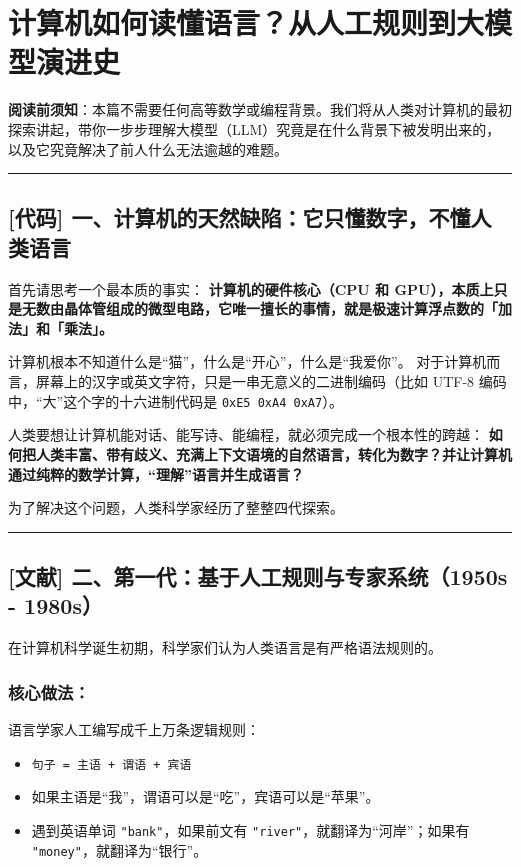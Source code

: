 \chapter{计算机如何读懂语言？从人工规则到大模型演进史}

\begin{noteBox}[核心导读与背景]
\textbf{阅读前须知}：本篇不需要任何高等数学或编程背景。我们将从人类对计算机的最初探索讲起，带你一步步理解大模型（LLM）究竟是在什么背景下被发明出来的，以及它究竟解决了前人什么无法逾越的难题。
\end{noteBox}

\vspace{0.8em}\hrule\vspace{0.8em}

\section{[代码] 一、计算机的天然缺陷：它只懂数字，不懂人类语言}

首先请思考一个最本质的事实：
\textbf{计算机的硬件核心（CPU 和 GPU），本质上只是无数由晶体管组成的微型电路，它唯一擅长的事情，就是极速计算浮点数的「加法」和「乘法」。}

计算机根本不知道什么是“猫”，什么是“开心”，什么是“我爱你”。
对于计算机而言，屏幕上的汉字或英文字符，只是一串无意义的二进制编码（比如 UTF-8 编码中，“大”这个字的十六进制代码是 \texttt{0xE5 0xA4 0xA7}）。

人类要想让计算机能对话、能写诗、能编程，就必须完成一个根本性的跨越：
\textbf{如何把人类丰富、带有歧义、充满上下文语境的自然语言，转化为数字？并让计算机通过纯粹的数学计算，“理解”语言并生成语言？}

为了解决这个问题，人类科学家经历了整整四代探索。

\vspace{0.8em}\hrule\vspace{0.8em}

\section{[文献] 二、第一代：基于人工规则与专家系统（1950s - 1980s）}

在计算机科学诞生初期，科学家们认为人类语言是有严格语法规则的。

\subsection{核心做法：}

语言学家人工编写成千上万条逻辑规则：
\begin{itemize}
  \item \texttt{句子 = 主语 + 谓语 + 宾语}
  \item 如果主语是“我”，谓语可以是“吃”，宾语可以是“苹果”。
  \item 遇到英语单词 \texttt{"bank"}，如果前文有 \texttt{"river"}，就翻译为“河岸”；如果有 \texttt{"money"}，就翻译为“银行”。
\end{itemize}

